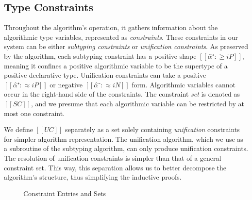 \subsection{Type Constraints}
Throughout the algorithm's operation, it gathers information about the
algorithmic type variables, represented as \emph{constraints}. These constraints
in our system can be either \emph{subtyping constraints} or \emph{unification
constraints}. As preserved by the algorithm, each subtyping constraint has a
positive shape $[[α̂⁺ :≥ iP]]$, meaning it confines a positive algorithmic
variable to be the supertype of a positive declarative type. Unification
constraints can take a positive $[[α̂⁺ :≈ iP]]$ or negative $[[α̂⁻ :≈ iN]]$
form. Algorithmic variables cannot occur in the right-hand side of the
constraints.  The constraint \emph{set} is denoted as $[[SC]]$, and we presume that each
algorithmic variable can be restricted by at most one constraint.

We define $[[UC]]$ separately as a set solely containing \emph{unification}
constraints for simpler algorithm representation. The unification algorithm,
which we use as a subroutine of the subtyping algorithm, can only produce
unification constraints. The resolution of unification constraints is simpler than
that of a general constraint set. This way, this separation allows us to better
decompose the algorithm's structure, thus simplifying the inductive proofs.

  \begin{figure}[t]
    \begin{minipage}{0.49\textwidth}
    \end{minipage}
    \begin{minipage}{0.49\textwidth}
    \end{minipage}
    \label{fig:syntax-e-sc}
    \caption{Constraint Entries and Sets}
  \end{figure}



